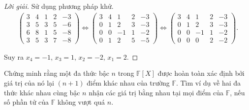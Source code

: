 \begin{proof}[Lời giải]
    Sử dụng phương pháp khử.
    \begingroup{}
    \allowdisplaybreaks{}
    \begin{gather*}
        \left(\begin{array}{cccc|c}
                3 & 4 & 1 & 2 & -3 \\
                3 & 5 & 3 & 5 & -6 \\
                6 & 8 & 1 & 5 & -8 \\
                3 & 5 & 3 & 7 & -8
            \end{array}
        \right)
        \Longleftrightarrow{}
        \left(\begin{array}{cccc|c}
                3 & 4 & 1  & 2 & -3 \\
                0 & 1 & 2  & 3 & -3 \\
                0 & 0 & -1 & 1 & -2 \\
                0 & 1 & 2  & 5 & -5
            \end{array}
        \right)
        \Longleftrightarrow{}
        \left(\begin{array}{cccc|c}
                3 & 4 & 1  & 2 & -3 \\
                0 & 1 & 2  & 3 & -3 \\
                0 & 0 & -1 & 1 & -2 \\
                0 & 0 & 0  & 2 & -2
            \end{array}
        \right).
    \end{gather*}
    \endgroup{}
    
    Suy ra $x_{4} = -1$, $x_{3} = 1$, $x_{2} = -2$, $x_{1} = 2$.
\end{proof}

\begin{exercise}
    Chứng minh rằng một đa thức bậc $n$ trong $\mathbb{F}[X]$ được hoàn toàn xác định bởi giá trị của nó lại $(n+1)$ điểm khác nhau của trường $\mathbb{F}$. Tìm ví dụ về hai đa thức khác nhau cùng bậc $n$ nhận các giá trị bằng nhau tại mọi điểm của $\mathbb{F}$, nếu số phần tử của $\mathbb{F}$ không vượt quá $n$.
\end{exercise}

